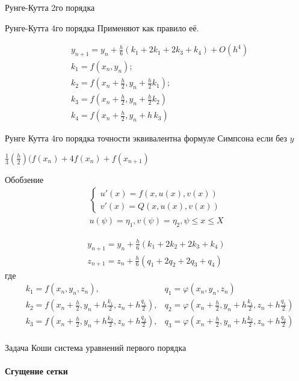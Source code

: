 Рунге-Кутта 2го порядка

Рунге-Кутта 4го порядка
Применяют как правило её.

\begin{align*}
	&y_{n+1} = y_n + \frac{h}{6}(k_1 + 2k_1 + 2k_3 + k_4) + O(h^4)
	\\
	&k_1 = f(x_n,y_n);
	\\
	&k_2 = f(x_n + \frac{h}{2}, y_n + \frac{h}{2}k_1);
	\\
	&k_3 = f(x_n + \frac{h}{2}, y_n + \frac{h}{2}k_2)
	\\
	&k_4 = f(x_n + \frac{h}{2}, y_n + h\,k_3)
\end{align*}

Рунге Кутта 4го порядка точности эквивалентна формуле Симпсона если без $y$

$\frac{1}{3}(\frac{h}{2})(f(x_n) + 4f(x_n) + f(x_{n+1})$

Обобзение
\begin{align*}
	\begin{cases*}
		u'(x) = f(x, u(x), v(x))\\
		v'(x) = Q(x, u(x), v(x))
	\end{cases*}
	\\
	u(\psi) = \eta_1, v(\psi) = \eta_2, \psi \leq x \leq X
\end{align*}

\begin{align*}
	y_{n+1} = y_n + \frac{h}{6} (k_1 + 2k_2 + 2k_3 + k_4)
	\\
	z_{n+1} = z_n + \frac{h}{6} (q_1 + 2q_2 + 2q_3 + q_4)
\end{align*}
где
\begin{align*}
	&k_1 = f(x_n, y_n, z_n), &q_1 = \varphi(x_n, y_n, z_n) \\
	&k_2 = f(x_n + \frac{h}{2}, y_n + h \frac{k_1}{2}, z_n + h \frac{q_1}{2}), &q_2 = \varphi(x_n + \frac{h}{2}, y_n + h \frac{k_1}{2}, z_n + h \frac{q_1}{2}) \\
	&k_3 = f(x_n + \frac{h}{2}, y_n + h \frac{k_2}{2}, z_n + h \frac{q_2}{2}), &q_3 = \varphi(x_n + \frac{h}{2}, y_n + h \frac{k_2}{2}, z_n + h \frac{q_2}{2}) \\
\end{align*}


Задача Коши система уравнений первого порядка



\paragraph{Сгущение сетки}







